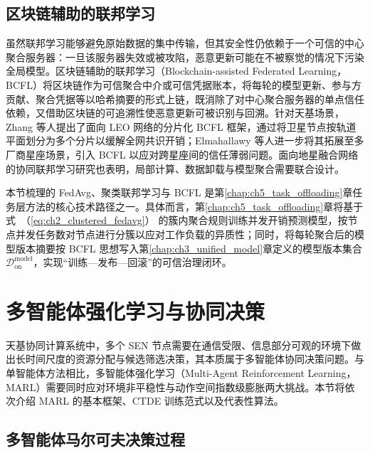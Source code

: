 \subsection{区块链辅助的联邦学习}
\label{subsec:ch2_bcfl}

虽然联邦学习能够避免原始数据的集中传输，但其安全性仍依赖于一个可信的中心聚合服务器：一旦该服务器失效或被攻陷，恶意更新可能在不被察觉的情况下污染全局模型。区块链辅助的联邦学习（Blockchain-assisted Federated Learning，BCFL）将区块链作为可信聚合中介或可信凭据账本，将每轮的模型更新、参与方贡献、聚合凭据等以哈希摘要的形式上链，既消除了对中心聚合服务器的单点信任依赖，又借助区块链的可追溯性使恶意更新可被识别与回溯\cite{Feng2022,ETSI2024BCFL,Elmahallawy2025}。针对天基场景，Zhang 等人\cite{ZhangLEO2024}提出了面向 LEO 网络的分片化 BCFL 框架，通过将卫星节点按轨道平面划分为多个分片以缓解全网共识开销；Elmahallawy 等人\cite{Elmahallawy2025}进一步将其拓展至多厂商星座场景，引入 BCFL 以应对跨星座间的信任薄弱问题。面向地星融合网络的协同联邦学习研究也表明，局部计算、数据卸载与模型聚合需要联合设计\cite{ref26}。

本节梳理的 FedAvg、聚类联邦学习与 BCFL 是第\ref{chap:ch5_task_offloading}章任务层方法的核心技术路径之一。具体而言，第\ref{chap:ch5_task_offloading}章将基于式~（\ref{eq:ch2_clustered_fedavg}） 的簇内聚合规则训练并发开销预测模型，按节点并发任务数对节点进行分簇以应对工作负载的异质性；同时，将每轮聚合后的模型版本摘要按 BCFL 思想写入第\ref{chap:ch3_unified_model}章定义的模型版本集合 $\mathcal{D}^{\mathrm{model}}_{\mathrm{on}}$，实现“训练—发布—回滚”的可信治理闭环。

\section{多智能体强化学习与协同决策}
\label{sec:ch2_marl}

天基协同计算系统中，多个 SEN 节点需要在通信受限、信息部分可观的环境下做出长时间尺度的资源分配与候选筛选决策，其本质属于多智能体协同决策问题。与单智能体方法相比，多智能体强化学习（Multi-Agent Reinforcement Learning，MARL）需要同时应对环境非平稳性与动作空间指数级膨胀两大挑战\cite{Shapley1953,Lowe2017,Amato2024CTDE,Liu2025MARL}。本节将依次介绍 MARL 的基本框架、CTDE 训练范式以及代表性算法。

\subsection{多智能体马尔可夫决策过程}
\label{subsec:ch2_dec_pomdp}

